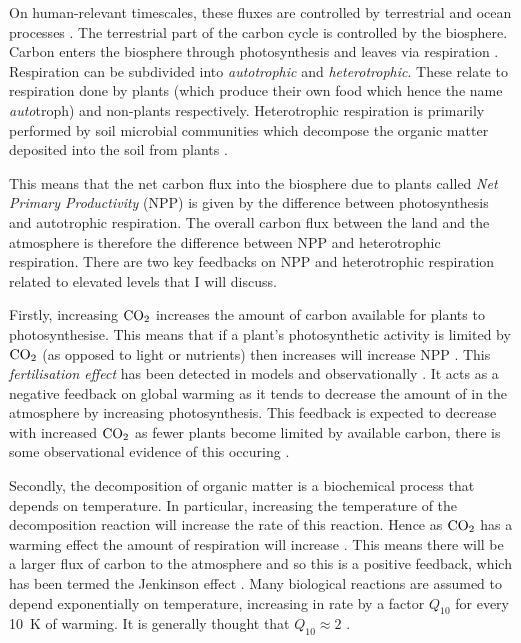 On human-relevant timescales, these fluxes are controlled by terrestrial and ocean processes \parencite{AR6}. The terrestrial part of the carbon cycle is controlled by the
biosphere. Carbon enters the biosphere through photosynthesis and leaves via respiration \parencite{Jenkinson1991}. Respiration can be subdivided into \emph{autotrophic} and \emph{heterotrophic}.
These relate to respiration done by plants (which produce their own food which hence the name \emph{auto}troph) and non-plants respectively. Heterotrophic respiration
is primarily performed by soil microbial communities which decompose the organic matter deposited into the soil from plants \parencite{Singh1977}.

This means that the net carbon flux into the biosphere due to plants called \emph{Net Primary Productivity} (NPP) is given by the difference between photosynthesis and
autotrophic respiration. The overall carbon flux between the land and the atmosphere is therefore the difference between NPP and heterotrophic respiration. There are two key feedbacks
on NPP and heterotrophic respiration related to elevated  levels that I will discuss.

Firstly, increasing $\ce{CO2}$ increases the amount of carbon available for plants to photosynthesise. This means that if a plant's photosynthetic activity is limited by
$\ce{CO2}$ (as opposed to light or nutrients) then increases  will increase NPP \parencite{Wenzel2016}. This \emph{ fertilisation effect} has been detected
in models \parencite{Friedlingstein2006,Arora2020} and observationally \parencite{Ainsworth2007,KolbySmith2016}. It acts as a negative feedback
on global warming as it tends to decrease the amount of  in the atmosphere by increasing photosynthesis. This feedback is expected to decrease with increased $\ce{CO2}$ as
fewer plants become limited by available carbon, there is some observational evidence of this occuring \parencite{Wang2020}.

Secondly, the decomposition of organic matter is a biochemical process that depends on temperature. In particular, increasing the temperature of the decomposition reaction
will increase the rate of this reaction. Hence as $\ce{CO2}$ has a warming effect the amount of respiration will increase \parencite{Jenkinson1991}. This means there will be a larger flux of carbon to the
atmosphere and so this is a positive feedback, which has been termed the Jenkinson effect \parencite{Luke2011}.
Many biological reactions are assumed to depend exponentially on temperature, increasing in rate by a factor $Q_{10}$ for every
\SI{10}{\kelvin} of warming. It is generally thought that $Q_{10} \approx 2$ \parencite{Jones2001}.

